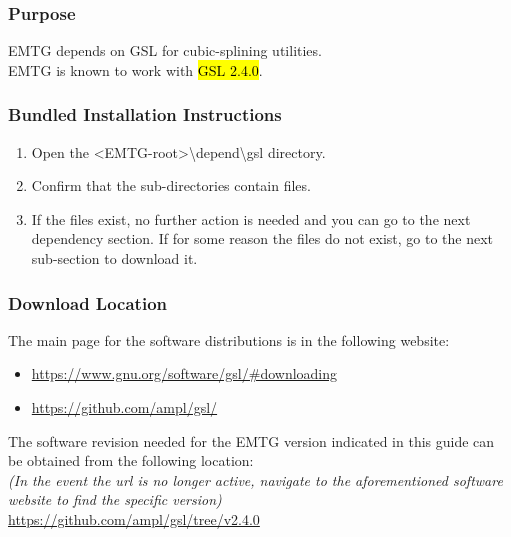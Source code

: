 
\subsubsection{Purpose}
\noindent \ac{EMTG} depends on \ac{GSL} for cubic-splining utilities. \\ \ac{EMTG} is known to work with \hl{GSL 2.4.0}. 

\subsubsection{Bundled Installation Instructions}
\begin{enumerate}
	\item Open the \textless EMTG-root\textgreater \textbackslash depend\textbackslash gsl directory.
	\item Confirm that the sub-directories contain files.
	\item If the files exist, no further action is needed and you can go to the next dependency section. If for some reason the files do not exist, go to the next sub-section to download it.
\end{enumerate}

\subsubsection{Download Location}
\noindent The main page for the software distributions is in the following website: \\
\begin{itemize}
	\item \url{https://www.gnu.org/software/gsl/#downloading}
	\item \url{https://github.com/ampl/gsl/}
\end{itemize}
	
\noindent The software revision needed for the EMTG version indicated in this guide can be obtained from the following location: \\
\emph{(In the event the url is no longer active, navigate to the aforementioned software website to find the specific version)} \\
\url{https://github.com/ampl/gsl/tree/v2.4.0}

